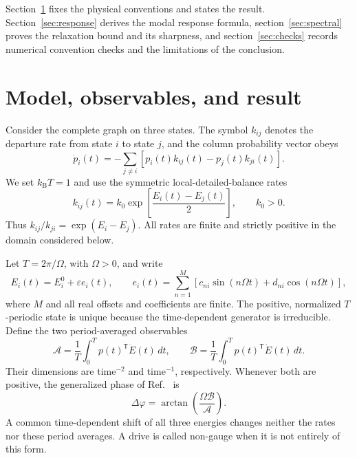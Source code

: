 \documentclass[11pt,a4paper]{article}
\newcommand{\Aobs}{\mathcal{A}}
\newcommand{\Bobs}{\mathcal{B}}
\newcommand{\eps}{\varepsilon}
\begin{document}
Section~\ref{sec:model} fixes the physical conventions and states the result.
Section~\ref{sec:response} derives the modal response formula,
section~\ref{sec:spectral} proves the relaxation bound and its sharpness, and
section~\ref{sec:checks} records numerical convention checks and the limitations of the
conclusion.

\section{Model, observables, and result}
\label{sec:model}

Consider the complete graph on three states. The symbol $k_{ij}$ denotes the departure
rate from state $i$ to state $j$, and the column probability vector obeys
\begin{equation}
 \dot p_i(t)=-\sum_{j\ne i}\left[p_i(t)k_{ij}(t)-p_j(t)k_{ji}(t)\right].
 \label{eq:master}
\end{equation}
We set $k_{\mathrm B}T=1$ and use the symmetric local-detailed-balance rates
\begin{equation}
 k_{ij}(t)=k_0\exp\!\left[\frac{E_i(t)-E_j(t)}{2}\right],
 \qquad k_0>0.
 \label{eq:rates}
\end{equation}
Thus $k_{ij}/k_{ji}=\exp(E_i-E_j)$. All rates are finite and strictly positive in
the domain considered below.

Let $T=2\pi/\Omega$, with $\Omega>0$, and write
\begin{equation}
 E_i(t)=E_i^0+\eps e_i(t),\qquad
 e_i(t)=\sum_{n=1}^{M}\left[c_{ni}\sin(n\Omega t)+d_{ni}\cos(n\Omega t)\right],
 \label{eq:drive}
\end{equation}
where $M$ and all real offsets and coefficients are finite. The positive, normalized
$T$-periodic state is unique because the time-dependent generator is irreducible. Define
the two period-averaged observables
\begin{equation}
 \Aobs=\frac{1}{T}\int_0^T p(t)^{\mathsf T}\ddot E(t)\,dt,
 \qquad
 \Bobs=\frac{1}{T}\int_0^T p(t)^{\mathsf T}\dot E(t)\,dt.
 \label{eq:observables}
\end{equation}
Their dimensions are time$^{-2}$ and time$^{-1}$, respectively. Whenever both are
positive, the generalized phase of Ref.~\cite{Deguenther2022} is
\begin{equation}
 \Delta\varphi=\arctan\!\left(\frac{\Omega\Bobs}{\Aobs}\right).
 \label{eq:phase}
\end{equation}
A common time-dependent shift of all three energies changes neither the rates nor these
period averages. A drive is called non-gauge when it is not entirely of this form.
\end{document}
